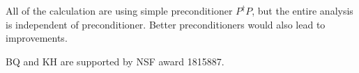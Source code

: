 \documentclass[twocolumn,linenumbers]{aastex631}
\newcommand{\Pdagger}{P^{\dagger}}
\begin{document}



All of the calculation are using simple preconditioner $\Pdagger P$, but 
the entire analysis is independent of preconditioner.
Better preconditioners would also lead to improvements.















\begin{acknowledgments}
BQ and KH are supported by NSF award 1815887.
\end{acknowledgments}

%




\end{document}
